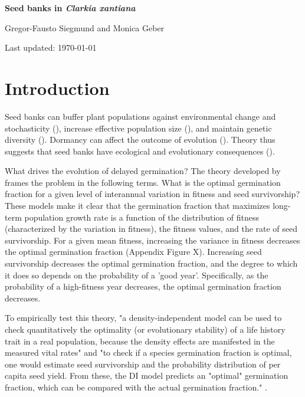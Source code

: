 \documentclass[12pt, oneside, titlepage]{article}   	%
\begin{document}
\begin{titlepage}
   \begin{center}
       \vspace*{1cm}
 
       \textbf{Seed banks in \textit{Clarkia xantiana}}
 
       \vspace{1.5cm}
 
       Gregor-Fausto Siegmund and Monica Geber
 
   	Last updated: \today
 
   \end{center}
\end{titlepage}
%

\section*{Introduction}

Seed banks can buffer plant populations against environmental change and stochasticity (\cite{eager2014,paniw2017}), increase effective population size (\cite{nunney2002,waples2006}), and maintain genetic diversity (\cite{mccue1998b}). Dormancy can affect the outcome of evolution (\cite{ritland1983,heinrich2018}). Theory thus suggests that seed banks have ecological and evolutionary consequences (\cite{evans2005}). 

What drives the evolution of delayed germination? The theory developed by \cite{cohen1966} frames the problem in the following terms. What is the optimal germination fraction for a given level of interannual variation in fitness and seed survivorship? These models make it clear that the germination fraction that maximizes long-term population growth rate is a function of the distribution of fitness (characterized by the variation in fitness), the fitness values, and the rate of seed survivorship. For a given mean fitness, increasing the variance in fitness decreases the optimal germination fraction (Appendix Figure X). Increasing seed survivorship decreases the optimal germination fraction, and the degree to which it does so depends on the probability of a 'good year'. Specifically, as the probability of a high-fitness year decreases, the optimal germination fraction decreases. 

To empirically test this theory, "a density-independent model can be used to check quantitatively the optimality (or evolutionary stability) of a life history trait in a real population, because the density effects are manifested in the measured vital rates" and "to check if a species germination fraction is optimal, one would estimate seed survivorship and the probability distribution of per capita seed yield. From these, the DI model predicts an "optimal" germination fraction, which can be compared with the actual germination fraction." \cite{ellner1985a}. 
\end{document}
